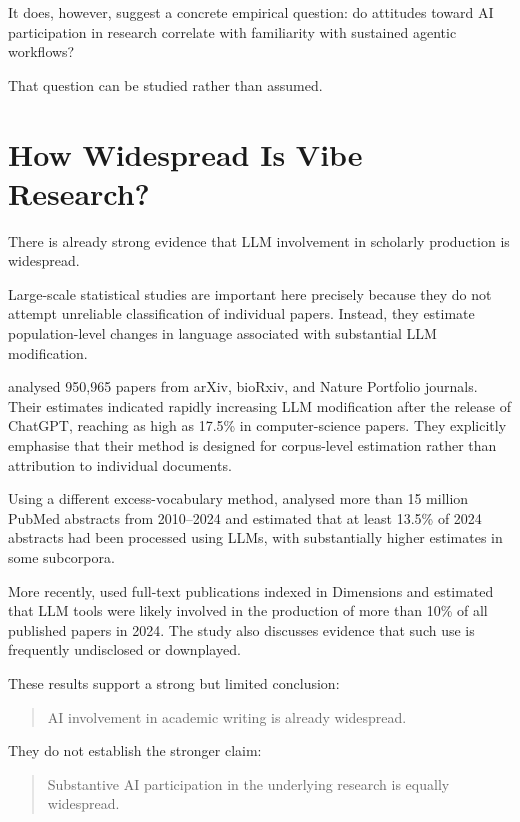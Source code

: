 \documentclass[12pt]{article}
\begin{document}
It does, however, suggest a concrete empirical question: do attitudes toward AI participation in research correlate with familiarity with sustained agentic workflows?

That question can be studied rather than assumed.


\section{How Widespread Is Vibe Research?}

There is already strong evidence that LLM involvement in scholarly production is widespread.

Large-scale statistical studies are important here precisely because they do not attempt unreliable classification of individual papers. Instead, they estimate population-level changes in language associated with substantial LLM modification.

\citet{liangEtAl2024mapping} analysed 950,965 papers from arXiv, bioRxiv, and Nature Portfolio journals. Their estimates indicated rapidly increasing LLM modification after the release of ChatGPT, reaching as high as 17.5\% in computer-science papers. They explicitly emphasise that their method is designed for corpus-level estimation rather than attribution to individual documents.

Using a different excess-vocabulary method, \citet{kobakEtAl2024biomedical} analysed more than 15 million PubMed abstracts from 2010--2024 and estimated that at least 13.5\% of 2024 abstracts had been processed using LLMs, with substantially higher estimates in some subcorpora.

More recently, \citet{gray2025prevalence} used full-text publications indexed in Dimensions and estimated that LLM tools were likely involved in the production of more than 10\% of all published papers in 2024. The study also discusses evidence that such use is frequently undisclosed or downplayed.

These results support a strong but limited conclusion:

\begin{quote}
AI involvement in academic writing is already widespread.
\end{quote}

They do not establish the stronger claim:

\begin{quote}
Substantive AI participation in the underlying research is equally widespread.
\end{quote}
\end{document}
